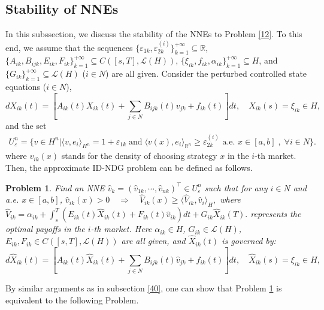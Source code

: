 \documentclass[10pt]{article}
\newtheorem{prob}{Problem}[section]
\begin{document}
\subsection{Stability of   NNEs}
In this subssection, we discuss the stability of the NNEs to Problem \ref{12}. To this end, we assume that the sequences $\{\varepsilon_{1k},\varepsilon^{(i)}_{2k}\}_{k=1}^{+\infty}\subseteq \mathbb{R}$, $\{A_{ik},B_{ijk},E_{ik},F_{ik}\}_{k=1}^{+\infty}\subseteq C([s,T],\mathcal{L}(H))$, $\{\xi_{ik},f_{ik},\alpha_{ik}\}_{k=1}^{+\infty}\subseteq H$, and $\{G_{ik}\}_{k=1}^{+\infty}\subseteq \mathcal{L}(H)$  ($i\in N$) are all given. Consider the perturbed controlled state equations ($i\in N$),
\begin{equation}\label{46}
dX_{ik}(t)=[A_{ik}(t)X_{ik}(t)+\sum_{j\in N}B_{ijk}(t)v_{jk}+f_{ik}(t)]dt,\quad X_{ik}(s)=\xi_{ik}\in H,
\end{equation}
and the set
\begin{align}\label{79}
U^n_{\varepsilon}=\{v\in H^n|\langle v,e_i\rangle_{H^n}=1+\varepsilon_{1k}
\;\mbox{and}\;\langle v(x),e_i\rangle_{\mathbb{R}^n}\geq\varepsilon^{(i)}_{2k}\mbox{ a.e. }x\in[a,b]\;,\;\forall i\in N\}.
\end{align}
where ${v}_{ik}(x)$ stands for the density of choosing strategy $x$ in the $i$-th market. Then, the approximate ID-NDG problem can be defined as follows.
\begin{prob}\label{39}
Find an NNE  $\widehat{v}_k=(\widehat{v}_{1k},\cdots,\widehat{v}_{nk})^{\top} \in U^n_{\varepsilon}$ such  that for any $i\in N$ and a.e. $x\in[a,b]$,
$
\widehat{v}_{ik}(x)>0\quad\Rightarrow\quad\widehat{V}_{ik}(x)\geq\langle\widehat{V}_{ik},\widehat{v}_i\rangle_{H},
$
where $
\widehat{V}_{ik}=\alpha_{ik}+\int_s^T(E_{ik}(t)\widehat{X}_{ik}(t)+F_{ik}(t)\widehat{v}_{ik})dt+G_{ik}\widehat{X}_{ik}(T).
$
represents the optimal payoffs in the $i$-th market. Here   $\alpha_{ik}\in H$, $G_{ik}\in\mathcal{L}(H)$, $E_{ik},F_{ik}\in C([s,T],\mathcal{L}(H))$ are all given, and $\widehat{X}_{ik}(t)$ is governed by:
\begin{equation}\label{71}
d\widehat{X}_{ik}(t)=[A_{ik}(t)\widehat{X}_{ik}(t)+\sum_{j\in N}B_{ijk}(t)\widehat{v}_{jk}+f_{ik}(t)]dt,\quad \widehat{X}_{ik}(s)=\xi_{ik}\in H,
\end{equation}
\end{prob}
By similar arguments as in subsection \ref{40}, one can show that Problem \ref{39} is equivalent to the following Problem.
\end{document}
